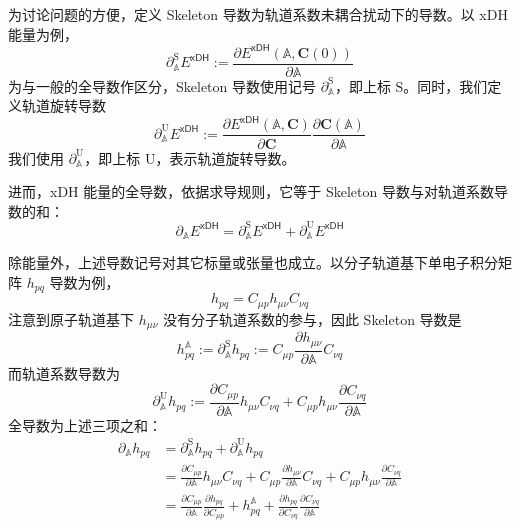 为讨论问题的方便，定义 Skeleton 导数为轨道系数未耦合扰动下的导数。以 xDH 能量为例，
\begin{equation}
  \partial_\mathbb{A}^\mathrm{S} E^\textsf{xDH} := \frac{\partial E^\textsf{xDH} (\mathbb{A}, \mathbf{C} (0))}{\partial \mathbb{A}}
\end{equation}
为与一般的全导数作区分，Skeleton 导数使用记号 $\partial_\mathbb{A}^\mathrm{S}$，即上标 $\mathrm{S}$。同时，我们定义轨道旋转导数
\begin{equation}
  \partial_\mathbb{A}^\mathrm{U} E^\textsf{xDH} := \frac{\partial E^\textsf{xDH} (\mathbb{A}, \mathbf{C})}{\partial \mathbf{C}} \frac{\partial \mathbf{C} (\mathbb{A})}{\partial \mathbb{A}}
\end{equation}
我们使用 $\partial_\mathbb{A}^\mathrm{U}$，即上标 $\mathrm{U}$，表示轨道旋转导数。

进而，xDH 能量的全导数，依据求导规则，它等于 Skeleton 导数与对轨道系数导数的和：
\begin{equation}
  \partial_\mathbb{A} E^\textsf{xDH} = \partial_\mathbb{A}^\mathrm{S} E^\textsf{xDH} + \partial_\mathbb{A}^\mathrm{U} E^\textsf{xDH}
\end{equation}

除能量外，上述导数记号对其它标量或张量也成立。以分子轨道基下单电子积分矩阵 $h_{pq}$ 导数为例，
\begin{equation*}
  h_{pq} = C_{\mu p} h_{\mu \nu} C_{\nu q}
\end{equation*}
注意到原子轨道基下 $h_{\mu \nu}$ 没有分子轨道系数的参与，因此 Skeleton 导数是
\begin{equation*}
  h_{pq}^\mathbb{A} := \partial_\mathbb{A}^\mathrm{S} h_{pq} := C_{\mu p} \frac{\partial h_{\mu \nu}}{\partial \mathbb{A}} C_{\nu q}
\end{equation*}
而轨道系数导数为
\begin{equation*}
  \partial_\mathbb{A}^\mathrm{U} h_{pq} := \frac{\partial C_{\mu p}}{\partial \mathbb{A}} h_{\mu \nu} C_{\nu q} + C_{\mu p} h_{\mu \nu} \frac{\partial C_{\nu q}}{\partial \mathbb{A}}
\end{equation*}
全导数为上述三项之和：
\begin{align*}
  \partial_\mathbb{A} h_{pq} &= \partial_\mathbb{A}^\mathrm{S} h_{pq} + \partial_\mathbb{A}^\mathrm{U} h_{pq} \\
  &= \frac{\partial C_{\mu p}}{\partial \mathbb{A}} h_{\mu \nu} C_{\nu q} + C_{\mu p} \frac{\partial h_{\mu \nu}}{\partial \mathbb{A}} C_{\nu q} + C_{\mu p} h_{\mu \nu} \frac{\partial C_{\nu q}}{\partial \mathbb{A}} \\
  &= \frac{\partial C_{\mu p}}{\partial \mathbb{A}} \frac{\partial h_{pq}}{\partial C_{\mu p}} + h_{pq}^\mathbb{A} + \frac{\partial h_{pq}}{\partial C_{\nu q}} \frac{\partial C_{\nu q}}{\partial \mathbb{A}}
\end{align*}



